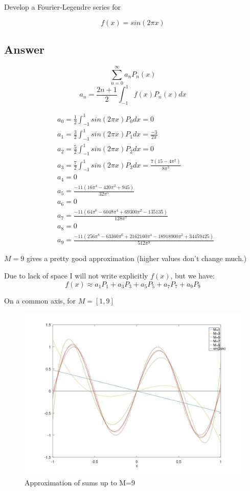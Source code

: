\documentclass{article}
\begin{document}
Develop a Fourier-Legendre series for

\begin{equation}\label{39A}
f(x) = sin(2\pi x)
\end{equation}
\subsection*{Answer}
$$ \sum_{n=0}^{\infty} a_n P_n (x) $$
$$ a_n = \frac{2n+1}{2} \int_{-1}^{1} f(x) P_n(x) dx $$

\begin{align*}
&a_0 = \frac{1}{2} \int_{-1}^{1} sin(2\pi x) P_0 dx = 0 \\
&a_1 = \frac{3}{2} \int_{-1}^{1} sin(2\pi x) P_1 dx = \frac{-3}{2\pi} \\
&a_2 = \frac{5}{2} \int_{-1}^{1} sin(2\pi x) P_2 dx = 0\\
&a_3 = \frac{7}{2} \int_{-1}^{1} sin(2\pi x) P_3 dx = \frac{7(15-4\pi^2)}{8\pi^3} \\
&a_4 = 0\\
&a_5 = \frac{-11(16\pi^4-420\pi^2+945)}{32\pi^5}\\
&a_6 = 0\\
&a_7 = \frac{-11(64\pi^6-6048\pi^4+69300\pi^2-135135)}{128\pi^7}\\
&a_8 = 0\\
&a_9 = \frac{-11(256\pi^8-63360\pi^6+2162160\pi^4-18918900\pi^2+34459425)}{512\pi^9}
\end{align*}

$M=9$ gives a pretty good approximation (higher values don't change much.)

Due to lack of space I will not write explicitly $f(x)$, but we have:
$$ f(x) \approx a_1 P_1 + a_3 P_3 + a_5 P_5 + a_7  P_7 + a_9 P_9 $$

On a common axis, for $M = [1,9]$
\begin{figure}
\centering
\includegraphics[width=1.0\textwidth]{./out.jpg}
\caption{Approximation of sums up to M=9}
\end{figure}
\end{document}
